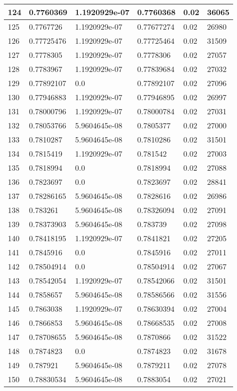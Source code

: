 \begin{longtable}{|l|l|l|l|l|l|}
124 & 0.7760369 & 1.1920929e-07 & 0.7760368 & 0.02 & 36065 \\ \hline 
125 & 0.7767726 & 1.1920929e-07 & 0.77677274 & 0.02 & 26980 \\ \hline 
126 & 0.77725476 & 1.1920929e-07 & 0.77725464 & 0.02 & 31509 \\ \hline 
127 & 0.7778305 & 1.1920929e-07 & 0.7778306 & 0.02 & 27057 \\ \hline 
128 & 0.7783967 & 1.1920929e-07 & 0.77839684 & 0.02 & 27032 \\ \hline 
129 & 0.77892107 & 0.0 & 0.77892107 & 0.02 & 27096 \\ \hline 
130 & 0.77946883 & 1.1920929e-07 & 0.77946895 & 0.02 & 26997 \\ \hline 
131 & 0.78000796 & 1.1920929e-07 & 0.78000784 & 0.02 & 27031 \\ \hline 
132 & 0.78053766 & 5.9604645e-08 & 0.7805377 & 0.02 & 27000 \\ \hline 
133 & 0.7810287 & 5.9604645e-08 & 0.7810286 & 0.02 & 31501 \\ \hline 
134 & 0.7815419 & 1.1920929e-07 & 0.781542 & 0.02 & 27003 \\ \hline 
135 & 0.7818994 & 0.0 & 0.7818994 & 0.02 & 27088 \\ \hline 
136 & 0.7823697 & 0.0 & 0.7823697 & 0.02 & 28841 \\ \hline 
137 & 0.78286165 & 5.9604645e-08 & 0.7828616 & 0.02 & 26986 \\ \hline 
138 & 0.783261 & 5.9604645e-08 & 0.78326094 & 0.02 & 27091 \\ \hline 
139 & 0.78373903 & 5.9604645e-08 & 0.783739 & 0.02 & 27098 \\ \hline 
140 & 0.78418195 & 1.1920929e-07 & 0.7841821 & 0.02 & 27205 \\ \hline 
141 & 0.7845916 & 0.0 & 0.7845916 & 0.02 & 27011 \\ \hline 
142 & 0.78504914 & 0.0 & 0.78504914 & 0.02 & 27067 \\ \hline 
143 & 0.78542054 & 1.1920929e-07 & 0.78542066 & 0.02 & 31501 \\ \hline 
144 & 0.7858657 & 5.9604645e-08 & 0.78586566 & 0.02 & 31556 \\ \hline 
145 & 0.7863038 & 1.1920929e-07 & 0.78630394 & 0.02 & 27004 \\ \hline 
146 & 0.7866853 & 5.9604645e-08 & 0.78668535 & 0.02 & 27008 \\ \hline 
147 & 0.78708655 & 5.9604645e-08 & 0.7870866 & 0.02 & 31522 \\ \hline 
148 & 0.7874823 & 0.0 & 0.7874823 & 0.02 & 31678 \\ \hline 
149 & 0.787921 & 5.9604645e-08 & 0.7879211 & 0.02 & 27078 \\ \hline 
150 & 0.78830534 & 5.9604645e-08 & 0.7883054 & 0.02 & 27021 \\ \hline 
\end{longtable}